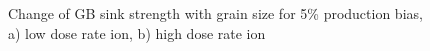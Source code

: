 \documentclass[a4paper]{article}
\begin{document}
\newpage
      \begin{figure}[h!]  %
        \centering
        \qquad
        \caption{Change of GB sink strength with grain size for 5\% production bias, a) low dose rate ion, b) high dose rate ion}
        \label{figure:sink_strengths_ion_5_1e-6}
      \end{figure}
\end{document}
